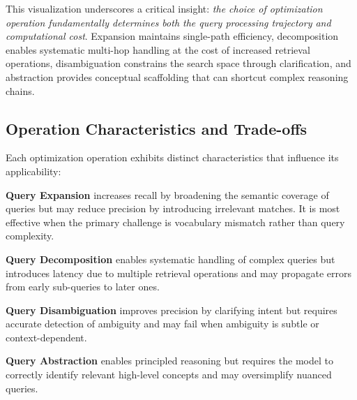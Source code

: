 \documentclass{article}
\begin{document}
This visualization underscores a critical insight: \textit{the choice of optimization operation fundamentally determines both the query processing trajectory and computational cost}. Expansion maintains single-path efficiency, decomposition enables systematic multi-hop handling at the cost of increased retrieval operations, disambiguation constrains the search space through clarification, and abstraction provides conceptual scaffolding that can shortcut complex reasoning chains.

\subsection{Operation Characteristics and Trade-offs}

Each optimization operation exhibits distinct characteristics that influence its applicability:

\textbf{Query Expansion} increases recall by broadening the semantic coverage of queries but may reduce precision by introducing irrelevant matches. It is most effective when the primary challenge is vocabulary mismatch rather than query complexity.

\textbf{Query Decomposition} enables systematic handling of complex queries but introduces latency due to multiple retrieval operations and may propagate errors from early sub-queries to later ones.

\textbf{Query Disambiguation} improves precision by clarifying intent but requires accurate detection of ambiguity and may fail when ambiguity is subtle or context-dependent.

\textbf{Query Abstraction} enables principled reasoning but requires the model to correctly identify relevant high-level concepts and may oversimplify nuanced queries.
\end{document}
